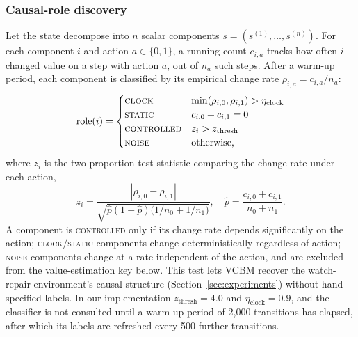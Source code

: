 \documentclass[conference]{IEEEtran}
\begin{document}
\subsubsection{Causal-role discovery}
Let the state decompose into $n$ scalar components $s = (s^{(1)}, \dots, s^{(n)})$. For each component $i$ and action $a \in \{0,1\}$, a running count $c_{i,a}$ tracks how often $i$ changed value on a step with action $a$, out of $n_a$ such steps. After a warm-up period, each component is classified by its empirical change rate $\rho_{i,a} = c_{i,a}/n_a$:
\begin{equation}
  \mathrm{role}(i) =
  \begin{cases}
    \textsc{clock}      & \min(\rho_{i,0}, \rho_{i,1}) > \eta_{\mathrm{clock}} \\
    \textsc{static}     & c_{i,0} + c_{i,1} = 0                                \\
    \textsc{controlled} & z_i > z_{\mathrm{thresh}}                            \\
    \textsc{noise}      & \text{otherwise,}
  \end{cases}
  \label{eq:causal-role}
\end{equation}
where $z_i$ is the two-proportion test statistic comparing the change rate under each action,
\begin{equation}
  z_i = \frac{|\rho_{i,0} - \rho_{i,1}|}{\sqrt{\hat{p}(1-\hat{p})\big(1/n_0 + 1/n_1\big)}}, \quad \hat{p} = \frac{c_{i,0}+c_{i,1}}{n_0+n_1} .
  \label{eq:z-test}
\end{equation}
A component is \textsc{controlled} only if its change rate depends significantly on the action; \textsc{clock}/\textsc{static} components change deterministically regardless of action; \textsc{noise} components change at a rate independent of the action, and are excluded from the value-estimation key below. This test lets VCBM recover the watch-repair environment's causal structure (Section~\ref{sec:experiments}) without hand-specified labels. In our implementation $z_{\mathrm{thresh}}=4.0$ and $\eta_{\mathrm{clock}}=0.9$, and the classifier is not consulted until a warm-up period of 2{,}000 transitions has elapsed, after which its labels are refreshed every 500 further transitions.
\end{document}
